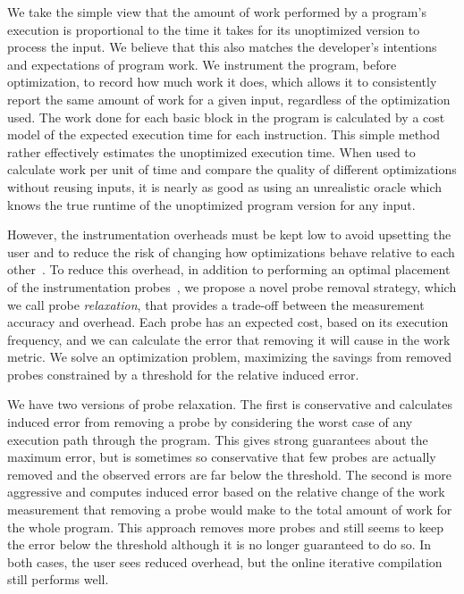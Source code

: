     We take the simple view that the amount of work performed by a program's execution is proportional to the time it takes for its
    unoptimized version to process the input. We believe that this also matches the developer's intentions and expectations of program
    work. We instrument the program, before optimization, to record how much work it does, which allows it to consistently report the same
    amount of work for a given input, regardless of the optimization used. The work done for each basic block in the program is calculated
    by a cost model of the expected execution time for each instruction. This simple method rather effectively estimates the unoptimized
    execution time. When used to calculate work per unit of time and compare the quality of different optimizations without reusing inputs,
    it is nearly as good as using an unrealistic oracle which knows the true runtime of the unoptimized program version for any input.
    
    However, the instrumentation overheads must be kept low to avoid upsetting the user and to reduce the risk of changing how
    optimizations behave relative to each other~\cite{forman81,anderson97,duesterwald00}. To reduce this overhead, in addition to
    performing an optimal placement of the instrumentation probes~\cite{knuth73,forman81,ball94}, we propose a novel probe removal
    strategy, which we call probe \textit{relaxation}, that provides a trade-off between the measurement accuracy and overhead. Each probe
    has an expected cost, based on its execution frequency, and we can calculate the error that removing it will cause in the work metric.
    We solve an optimization problem, maximizing the savings from removed probes constrained by a threshold for the relative induced error.

    We have two versions of probe relaxation. The first is conservative and calculates induced error from removing a probe by considering
    the worst case of any execution path through the program. This gives strong guarantees about the maximum error, but is sometimes so
    conservative that few probes are actually removed and the observed errors are far below the threshold. The second is more aggressive
    and computes induced error based on the relative change of the work measurement that removing a probe would make to the total amount
    of work for the whole program. This approach removes more probes and still seems to keep the error below the threshold although it is
    no longer guaranteed to do so. In both cases, the user sees reduced overhead, but the online iterative compilation still performs well.

